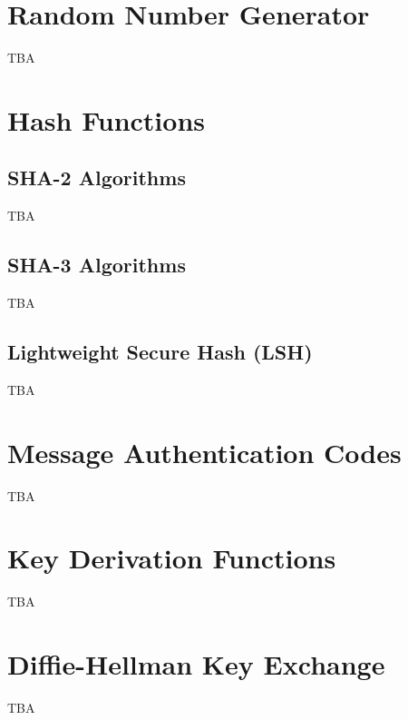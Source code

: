 \documentclass[11pt,a4paper]{report}
\theoremstyle{definitionstyle}
\begin{document}
\section{Random Number Generator}
TBA

\section{Hash Functions}
\subsection{SHA-2 Algorithms}
TBA
\subsection{SHA-3 Algorithms}
TBA
\subsection{Lightweight Secure Hash (LSH)}
TBA

\section{Message Authentication Codes}
TBA

\section{Key Derivation Functions}
TBA

\section{Diffie-Hellman Key Exchange}
TBA
\end{document}
